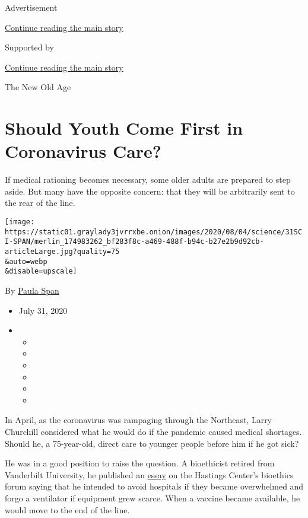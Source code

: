 Advertisement

\protect\hyperlink{after-top}{Continue reading the main story}

Supported by

\protect\hyperlink{after-sponsor}{Continue reading the main story}

The New Old Age

\hypertarget{should-youth-come-first-in-coronavirus-care}{%
\section{Should Youth Come First in Coronavirus
Care?}\label{should-youth-come-first-in-coronavirus-care}}

If medical rationing becomes necessary, some older adults are prepared
to step aside. But many have the opposite concern: that they will be
arbitrarily sent to the rear of the line.

\texttt{[image: https://static01.graylady3jvrrxbe.onion/images/2020/08/04/science/31SCI-SPAN/merlin\_174983262\_bf283f8c-a469-488f-b94c-b27e2b9d92cb-articleLarge.jpg?quality=75\\\&auto=webp\\\&disable=upscale]}

By \href{https://www.nytimes3xbfgragh.onion/by/paula-span}{Paula Span}

\begin{itemize}
\item
  July 31, 2020
\item
  \begin{itemize}
  \item
  \item
  \item
  \item
  \item
  \item
  \end{itemize}
\end{itemize}

In April, as the coronavirus was rampaging through the Northeast, Larry
Churchill considered what he would do if the pandemic caused medical
shortages. Should he, a 75-year-old, direct care to younger people
before him if he got sick?

He was in a good position to raise the question. A bioethicist retired
from Vanderbilt University, he published an
\href{https://www.thehastingscenter.org/on-being-an-elder-in-a-pandemic/}{essay}
on the Hastings Center's bioethics forum saying that he intended to
avoid hospitals if they became overwhelmed and forgo a ventilator if
equipment grew scarce. When a vaccine became available, he would move to
the end of the line.

